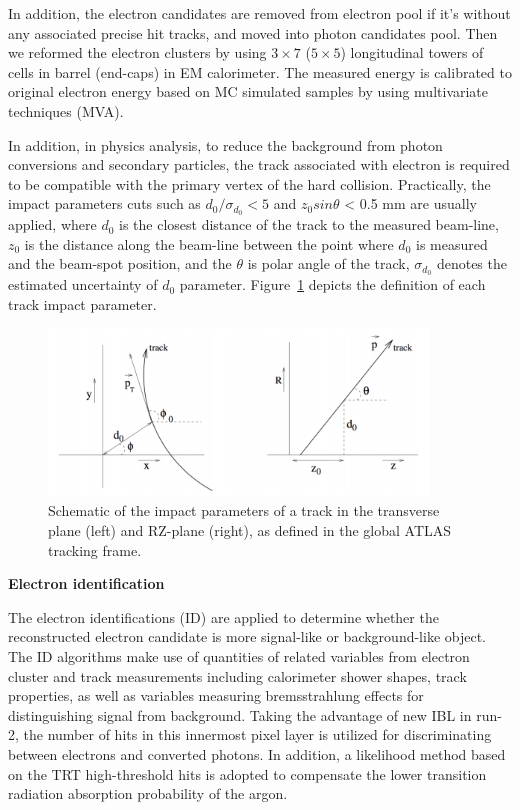 \begin{enumerate}
In addition, the electron candidates are removed from electron pool if it's without any associated precise hit tracks, and moved into photon candidates pool. Then we reformed the electron clusters by using $3 \times 7$ ($5 \times 5$) longitudinal towers of cells in barrel (end-caps) in EM calorimeter. The measured energy is calibrated to original electron energy based on MC simulated samples by using multivariate techniques (MVA).
\end{enumerate}

In addition, in physics analysis, to reduce the background from photon conversions and secondary particles, the track associated with electron is required to be compatible with the primary vertex of the hard collision. 
Practically, the impact parameters cuts such as $d_{0}/\sigma_{d_{0}} < 5$ and $z_{0}sin\theta$ < 0.5 mm are usually applied, where $d_{0}$ is the closest distance of the track to the measured beam-line, $z_{0}$ is the distance along the beam-line between the point where $d_{0}$ is measured and the beam-spot position, and the $\theta$ is polar angle of the track, $\sigma_{d_{0}}$ denotes the estimated uncertainty of $d_{0}$ parameter. 
Figure~\ref{fig:ele_d0z0} depicts the definition of each track impact parameter.
\begin{figure}[!htb]
  \centering
  \includegraphics[width=0.9\textwidth]{figures/Simulation/track_parameter_2d.png}
  \caption{Schematic of the impact parameters of a track in the transverse plane (left)
and RZ-plane (right), as defined in the global ATLAS tracking frame\cite{Limper:1202457}.}
  \label{fig:ele_d0z0}
\end{figure}

\textbf{Electron identification}

The electron identifications (ID) are applied to determine whether the reconstructed electron candidate is more signal-like or background-like object.
The ID algorithms make use of quantities of related variables from electron cluster and track measurements including calorimeter shower shapes, track properties, 
as well as variables measuring bremsstrahlung effects for distinguishing signal from background.
Taking the advantage of new IBL in run-2, the number of hits in this innermost pixel layer is utilized for discriminating between electrons and converted photons.
In addition, a likelihood method based on the TRT high-threshold hits is adopted to compensate the lower transition radiation absorption probability of the argon.

